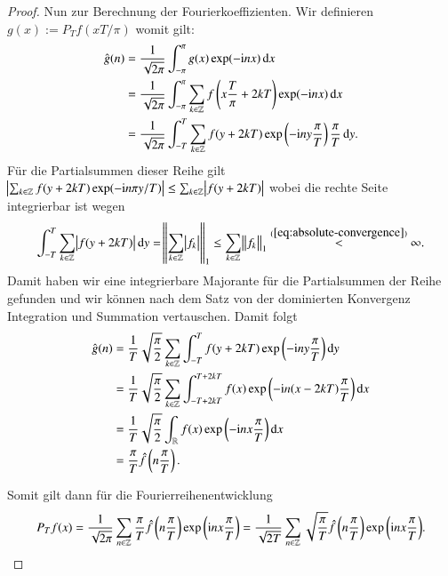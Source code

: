 \begin{proof}
  Nun zur Berechnung der Fourierkoeffizienten. Wir definieren $g(x):=P_T f(xT/\pi)$ womit gilt:
  \begin{equation*}
    \begin{split}
      \fouriertransform{g}(n)
      & =\frac{1}{\sqrt{2\pi}} \int_{-\pi}^\pi{g(x)\exp(-\i nx) \dif x} \\
      & =\frac{1}{\sqrt{2\pi}} \int_{-\pi}^\pi{\sum_{k \in \Z}{f\left(x\frac{T}{\pi} + 2kT\right)} \exp(-\i nx) \dif x} \\
      &= \frac{1}{\sqrt{2\pi}} \int_{-T}^T{\sum_{k \in \Z}{f(y + 2kT)} \exp\left(-\i n y\frac{\pi}{T} \right) \frac{\pi}{T} \dif y}.
    \end{split}
  \end{equation*}
  Für die Partialsummen dieser Reihe gilt $\abs{\sum_{k \in \mathbb{Z}}{f(y+2kT) \exp (-\mathrm{i} n\pi y/T)}} \leq \sum_{k \in \mathbb{Z}}{\abs{f(y+2kT)}}$ wobei die rechte Seite integrierbar ist wegen
  \begin{equation*}
    \int_{-T}^{T}{\sum_{k \in \Z}{\abs{f(y+2kT)}} \dif y}
    = \norm{\sum_{k \in \Z}{\abs{f_k}}}_1
    \leq \sum_{k \in \Z}{\norm{f_k}_1}
    \stackrel{(\ref{eq:absolute-convergence})}{<} \infty.
  \end{equation*}
  Damit haben wir eine integrierbare Majorante für die Partialsummen der Reihe gefunden und wir können nach dem Satz von der dominierten Konvergenz Integration und Summation vertauschen.
  Damit folgt
  \begin{equation*}
    \begin{split}
      \fouriertransform{g}(n)
      &=\frac{1}{T}\sqrt{\frac{\pi}{2}} \sum_{k \in \Z}{\int_{-T}^T{f(y+2kT) \exp\left(-\i n y\frac{\pi}{T}\right) \dif y}} \\
      &=\frac{1}{T} \sqrt{\frac{\pi}{2}} \sum_{k \in \Z}{\int_{-T+2kT}^{T+2kT}{f(x)\exp\left(-\i n (x-2kT)\frac{\pi}{T} \right) \dif x}} \\
      &=\frac{1}{T} \sqrt{\frac{\pi}{2}} \int_\R{f(x) \exp \left(-\i n x\frac{\pi}{T}\right) \dif x} \\
      &= \frac{\pi}{T}\fouriertransform{f}\left(n\frac{\pi}{T}\right).
    \end{split}
  \end{equation*}

  Somit gilt dann für die Fourierreihenentwicklung
  \begin{equation*}
    P_T f(x)
    =\frac{1}{\sqrt{2\pi}}\sum_{n \in \mathbb{Z}}{\frac{\pi}{T} \hat{f}\left(n\frac{\pi}{T}\right) \exp\left(\mathrm{i} n x\frac{\pi}{T}\right)}
    =\frac{1}{\sqrt{2T}}\sum_{n \in \mathbb{Z}}{\sqrt{\frac{\pi}{T}} \hat{f}\left(n \frac{\pi}{T}\right)\exp\left(\mathrm{i} n x\frac{\pi}{T}\right)}.
  \end{equation*}
\end{proof}
